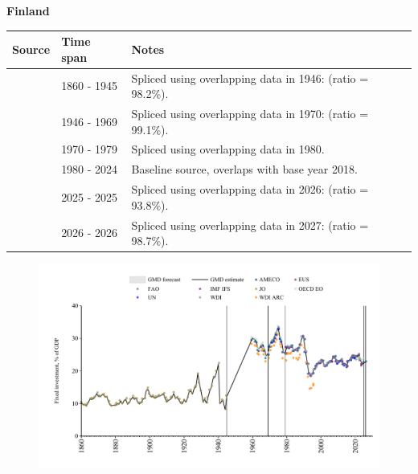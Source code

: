 \documentclass[12pt,a4paper,landscape]{article}
\begin{document}
\begin{adjustbox}{max totalsize={\paperwidth}{\paperheight},center}
\begin{minipage}[t][\textheight][t]{\textwidth}
\vspace*{0.5cm}
{}
\begin{center}
{\Large\bfseries Finland}
\end{center}
\vspace{0.5cm}
\begin{table}[H]
\centering
\small
\begin{tabular}{|l|l|l|}
\hline
\textbf{Source} & \textbf{Time span} & \textbf{Notes} \\
\hline
\rowcolor{white}\cite{JO}& 1860 - 1945 &Spliced using overlapping data in 1946: (ratio = 98.2\%).\\
\rowcolor{lightgray}\cite{OECD_EO}& 1946 - 1969 &Spliced using overlapping data in 1970: (ratio = 99.1\%).\\
\rowcolor{white}\cite{WDI}& 1970 - 1979 &Spliced using overlapping data in 1980.\\
\rowcolor{lightgray}\cite{EUS}& 1980 - 2024 &Baseline source, overlaps with base year 2018.\\
\rowcolor{white}\cite{OECD_EO}& 2025 - 2025 &Spliced using overlapping data in 2026: (ratio = 93.8\%).\\
\rowcolor{lightgray}\cite{AMECO}& 2026 - 2026 &Spliced using overlapping data in 2027: (ratio = 98.7\%).\\
\hline
\end{tabular}
\end{table}
\begin{figure}[H]
\centering
\includegraphics[width=\textwidth,height=0.6\textheight,keepaspectratio]{graphs/FIN_finv_GDP.pdf}
\end{figure}
\end{minipage}
\end{adjustbox}
\end{document}
